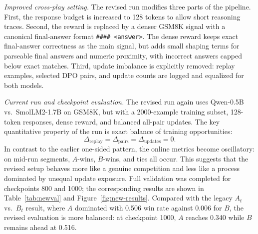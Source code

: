 \documentclass[10pt,a4paper]{article}
\begin{document}
\textit{Improved cross-play setting.}\newline
The revised run modifies three parts of the pipeline. First, the response budget is increased to 128 tokens to allow short reasoning traces. Second, the reward is replaced by a denser GSM8K signal with a canonical final-answer format \texttt{\#\#\#\# <answer>}. The dense reward keeps exact final-answer correctness as the main signal, but adds small shaping terms for parseable final answers and numeric proximity, with incorrect answers capped below exact matches. Third, update imbalance is explicitly removed: replay examples, selected DPO pairs, and update counts are logged and equalized for both models.

\textit{Current run and checkpoint evaluation.}
The revised run again uses Qwen-0.5B vs.\ SmolLM2-1.7B on GSM8K, but with a 2000-example training subset, 128-token responses, dense reward, and balanced all-pair updates. The key quantitative property of the run is exact balance of training opportunities:
\[
\Delta_{\text{replay}} = \Delta_{\text{pairs}} = \Delta_{\text{updates}} = 0.
\]
In contrast to the earlier one-sided pattern, the online metrics become oscillatory: on mid-run segments, $A$-wins, $B$-wins, and ties all occur. This suggests that the revised setup behaves more like a genuine competition and less like a process dominated by unequal update exposure. Full validation was completed for checkpoints 800 and 1000; the corresponding results are shown in Table~\ref{tab:newval} and Figure~\ref{fig:new-results}. Compared with the legacy $A_t$ vs.\ $B_t$ result, where $A$ dominated with 0.506 win rate against 0.006 for $B$, the revised evaluation is more balanced: at checkpoint 1000, $A$ reaches 0.340 while $B$ remains ahead at 0.516.
\end{document}
